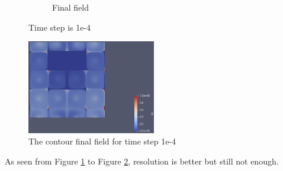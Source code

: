\documentclass{article}
\begin{document}
\begin{figure}[hbt!]
\begin{subfigure}{0.4\textwidth}
        \caption{Final field}
  \end{subfigure}
  \caption{Time step is 1e-4}
  \label{t1m3_1} 
\end{figure}

\begin{figure}[hbt!]
    \centering
    \includegraphics[width=0.5\textwidth]{Figures/e-4 80x80/contour.png}
    \caption{The contour final field for time step 1e-4}
    \label{t1m3_2} 
\end{figure}

As seen from Figure \ref{t1m3_1} to Figure \ref{t1m3_2}, resolution is better but still not enough.


\clearpage
\end{document}
